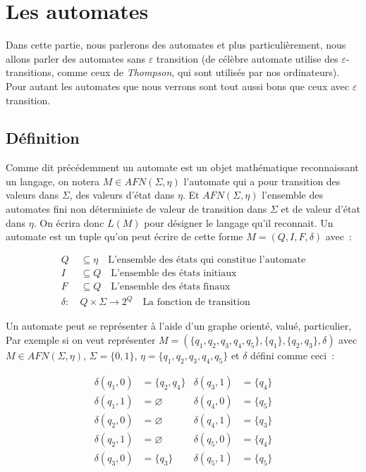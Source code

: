 \section{Les automates}

Dans cette partie, nous parlerons des automates et plus particulièrement, nous
allons parler des automates sans \(\varepsilon\) transition (de célèbre
automate utilise des \(\varepsilon\)-transitions, comme ceux de
\textit{Thompson}, qui sont utilisés par nos ordinateurs). Pour autant les
automates que nous verrons sont tout aussi bons que ceux avec \(\varepsilon\)
transition.

\subsection{Définition}

Comme dit précédemment un automate est un objet mathématique reconnaissant un
langage, on notera \(M \in AFN(\Sigma, \eta)\) l'automate qui a pour transition
des valeurs dans \(\Sigma\), des valeurs \og{}d'état\fg{} dans \(\eta\). Et
\(AFN(\Sigma, \eta)\) l'ensemble des automates fini non déterministe de valeur
de transition dans \(\Sigma\) et de valeur d'état dans \(\eta\). On écrira donc
\(L(M)\) pour désigner le langage qu'il reconnait. Un automate est un tuple
qu'on peut écrire de cette forme \(M = (Q, I, F, \delta)\) avec~:

\begin{align*}
    Q        & \subseteq \eta \quad \text{L'ensemble des états qui constitue l'automate} \\
    I        & \subseteq Q \quad \text{L'ensemble des états initiaux}                    \\
    F        & \subseteq Q \quad \text{L'ensemble des états finaux}                      \\
    \delta:~ & Q \times \Sigma \to 2^Q \quad \text{La fonction de transition}
\end{align*}

Un automate peut se représenter à l'aide d'un graphe orienté, valué,
particulier, Par exemple si on veut représenter \(M = (\{q_1, q_2, q_3, q_4,
q_5\}, \{q_1\},\{q_2, q_3\}, \delta)\) avec \(M \in AFN(\Sigma, \eta)\),
\(\Sigma = \{0, 1\}\), \(\eta = \{q_1, q_2, q_3, q_4, q_5\}\) et \(\delta\)
défini comme ceci~:

\begin{align*}
    \delta(q_1, 0) & = \{q_2, q_4\} & \delta(q_3, 1) & = \{q_4\} \\
    \delta(q_1, 1) & = \varnothing  & \delta(q_4, 0) & = \{q_5\} \\
    \delta(q_2, 0) & = \varnothing  & \delta(q_4, 1) & = \{q_3\} \\
    \delta(q_2, 1) & = \varnothing  & \delta(q_5, 0) & = \{q_4\} \\
    \delta(q_3, 0) & = \{q_3\}      & \delta(q_5, 1) & = \{q_5\} \\
\end{align*}

